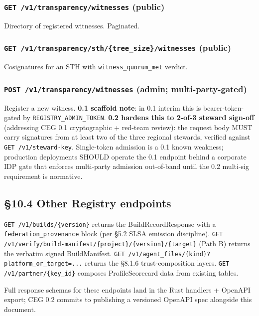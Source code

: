 \documentclass[11pt]{article}
\begin{document}
\subsubsection*{\texttt{GET /v1/transparency/witnesses} (public)}


Directory of registered witnesses. Paginated.


\subsubsection*{\texttt{GET /v1/transparency/sth/\{tree\_size\}/witnesses} (public)}


Cosignatures for an STH with \texttt{witness\_quorum\_met} verdict.


\subsubsection*{\texttt{POST /v1/transparency/witnesses} (admin; multi-party-gated)}


Register a new witness. \textbf{0.1 scaffold note}: in 0.1 interim this is bearer-token-gated by \texttt{REGISTRY\_ADMIN\_TOKEN}. \textbf{0.2 hardens this to 2-of-3 steward sign-off} (addressing CEG 0.1 cryptographic + red-team review): the request body MUST carry signatures from at least two of the three regional stewards, verified against \texttt{GET /v1/steward-key}. Single-token admission is a 0.1 known weakness; production deployments SHOULD operate the 0.1 endpoint behind a corporate IDP gate that enforces multi-party admission out-of-band until the 0.2 multi-sig requirement is normative.


\subsection*{§10.4 Other Registry endpoints}


\texttt{GET /v1/builds/\{version\}} returns the BuildRecordResponse with a \texttt{federation\_provenance} block (per §5.2 SLSA emission discipline). \texttt{GET /v1/verify/build-manifest/\{project\}/\{version\}/\{target\}} (Path B) returns the verbatim signed BuildManifest. \texttt{GET /v1/agent\_files/\{kind\}?platform\_or\_target=...} returns the §8.1.6 trust-composition layers. \texttt{GET /v1/partner/\{key\_id\}} composes ProfileScorecard data from existing tables.


Full response schemas for these endpoints land in the Rust handlers + OpenAPI export; CEG 0.2 commits to publishing a versioned OpenAPI spec alongside this document.
\end{document}
